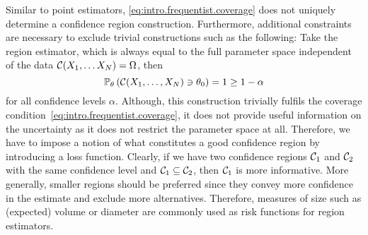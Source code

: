 Similar to point estimators, \cref{eq:intro.frequentist.coverage} does not uniquely determine a confidence region construction.
Furthermore, additional constraints are necessary to exclude trivial constructions such as the following:
Take the region estimator, which is always equal to the full parameter space independent of the data $\mathcal{C}(X_1, \ldots X_N) = \Omega$, then
\[
  \mathbb{P}_\theta\left(  \mathcal{C}(X_1, \ldots, X_N) \ni \theta_0  \right) = 1 \ge 1 - \alpha
\]
for all confidence levels $\alpha$.
Although, this construction trivially fulfils the coverage condition~\eqref{eq:intro.frequentist.coverage}, it does not provide useful information on the uncertainty as it does not restrict the parameter space at all.
Therefore, we have to impose a notion of what constitutes a good confidence region by introducing a loss function.
Clearly, if we have two confidence regions $\mathcal{C}_1$ and $\mathcal{C}_2$ with the same confidence level and $\mathcal{C}_1 \subseteq \mathcal{C}_2$, then $\mathcal{C}_1$ is more informative.
More generally, smaller regions should be preferred since they convey more confidence in the estimate and exclude more alternatives.
Therefore, measures of size such as (expected) volume or diameter are commonly used as risk functions for region estimators.


